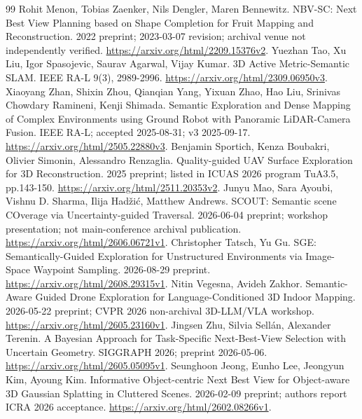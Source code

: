 \documentclass[11pt,a4paper]{article}
\begin{document}
\begin{thebibliography}{99}
 Rohit Menon, Tobias Zaenker, Nils Dengler, Maren Bennewitz. NBV-SC: Next Best View Planning based on Shape Completion for Fruit Mapping and Reconstruction. 2022 preprint; 2023-03-07 revision; archival venue not independently verified. \url{https://arxiv.org/html/2209.15376v2}.
 Yuezhan Tao, Xu Liu, Igor Spasojevic, Saurav Agarwal, Vijay Kumar. 3D Active Metric-Semantic SLAM. IEEE RA-L 9(3), 2989-2996. \url{https://arxiv.org/html/2309.06950v3}.
 Xiaoyang Zhan, Shixin Zhou, Qianqian Yang, Yixuan Zhao, Hao Liu, Srinivas Chowdary Ramineni, Kenji Shimada. Semantic Exploration and Dense Mapping of Complex Environments using Ground Robot with Panoramic LiDAR-Camera Fusion. IEEE RA-L; accepted 2025-08-31; v3 2025-09-17. \url{https://arxiv.org/html/2505.22880v3}.
 Benjamin Sportich, Kenza Boubakri, Olivier Simonin, Alessandro Renzaglia. Quality-guided UAV Surface Exploration for 3D Reconstruction. 2025 preprint; listed in ICUAS 2026 program TuA3.5, pp.143-150. \url{https://arxiv.org/html/2511.20353v2}.
 Junyu Mao, Sara Ayoubi, Vishnu D. Sharma, Ilija Hadžić, Matthew Andrews. SCOUT: Semantic scene COverage via Uncertainty-guided Traversal. 2026-06-04 preprint; workshop presentation; not main-conference archival publication. \url{https://arxiv.org/html/2606.06721v1}.
 Christopher Tatsch, Yu Gu. SGE: Semantically-Guided Exploration for Unstructured Environments via Image-Space Waypoint Sampling. 2026-08-29 preprint. \url{https://arxiv.org/html/2608.29315v1}.
 Nitin Vegesna, Avideh Zakhor. Semantic-Aware Guided Drone Exploration for Language-Conditioned 3D Indoor Mapping. 2026-05-22 preprint; CVPR 2026 non-archival 3D-LLM/VLA workshop. \url{https://arxiv.org/html/2605.23160v1}.
 Jingsen Zhu, Silvia Sellán, Alexander Terenin. A Bayesian Approach for Task-Specific Next-Best-View Selection with Uncertain Geometry. SIGGRAPH 2026; preprint 2026-05-06. \url{https://arxiv.org/html/2605.05095v1}.
 Seunghoon Jeong, Eunho Lee, Jeongyun Kim, Ayoung Kim. Informative Object-centric Next Best View for Object-aware 3D Gaussian Splatting in Cluttered Scenes. 2026-02-09 preprint; authors report ICRA 2026 acceptance. \url{https://arxiv.org/html/2602.08266v1}.
\end{thebibliography}
\end{document}
